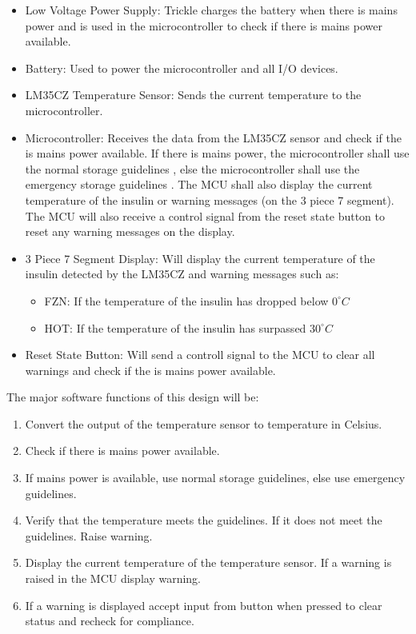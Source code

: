 \begin{itemize}
  \item Low Voltage Power Supply: Trickle charges the battery when there is mains power and is used in the microcontroller to check if there is mains power available.
  \item Battery: Used to power the microcontroller and all I/O devices.
  \item LM35CZ Temperature Sensor: Sends the current temperature to the microcontroller.
  \item Microcontroller: Receives the data from the LM35CZ sensor and check if the is mains power available. If there is mains power, the microcontroller shall use the normal storage guidelines \cite{bahendekaEADSGGuidelinesInsulin2019}, else the microcontroller shall use the emergency storage guidelines \cite{ManagingInsulinEmergency2021}. The MCU shall also display the current temperature of the insulin or warning messages (on the 3 piece 7 segment). The MCU will also receive a control signal from the reset state button to reset any warning messages on the display.
  \item 3 Piece 7 Segment Display: Will display the current temperature of the insulin detected by the LM35CZ and warning messages such as:
        \begin{itemize}
          \item FZN: If the temperature of the insulin has dropped below $0^{\circ}C$
          \item HOT: If the temperature of the insulin has surpassed $30^{\circ}C$
        \end{itemize}
  \item Reset State Button: Will send a controll signal to the MCU to clear all warnings and check if the is mains power available.
\end{itemize}
The major software functions of this design will be:
\begin{enumerate}
  \item Convert the output of the temperature sensor to temperature in Celsius.
        \item Check if there is mains power available.
        \item If mains power is available, use normal storage guidelines, else use emergency guidelines.
        \item Verify that the temperature meets the guidelines. If it does not meet the guidelines. Raise warning.
        \item Display the current temperature of the temperature sensor. If a warning is raised in the MCU display warning.
        \item If a warning is displayed accept input from button when pressed to clear status and recheck for compliance.
\end{enumerate}

